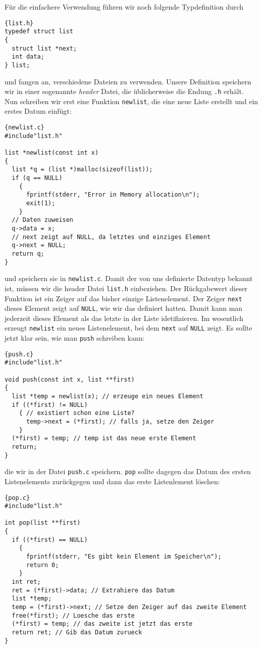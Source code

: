 Für die einfachere Verwendung führen wir noch folgende Typdefinition durch
\begin{lstlisting}{list.h}
typedef struct list
{
  struct list *next;
  int data;
} list;
\end{lstlisting}
und fangen an, verschiedene Dateien zu verwenden.
Unsere Definition speichern wir in einer sogenannte \emph{header} Datei, die üblicherweise die Endung \texttt{.h} erhält.
Nun schreiben wir erst eine Funktion \verb|newlist|, die eine neue Liste erstellt und ein erstes Datum einfügt:
\begin{lstlisting}{newlist.c}
#include"list.h"

list *newlist(const int x)
{
  list *q = (list *)malloc(sizeof(list));
  if (q == NULL)
    {
      fprintf(stderr, "Error in Memory allocation\n");
      exit(1);
    }
  // Daten zuweisen
  q->data = x;
  // next zeigt auf NULL, da letztes und einziges Element
  q->next = NULL;
  return q;
}
\end{lstlisting}
und speichern sie in \texttt{newlist.c}.
Damit der von uns definierte Datentyp bekannt ist, müssen wir die header Datei \texttt{list.h} einbeziehen.
Der Rückgabewert dieser Funktion ist ein Zeiger auf das bisher einzige Listenelement.
Der Zeiger \verb|next| dieses Element zeigt auf \verb|NULL|, wie wir das definiert hatten.
Damit kann man jederzeit dieses Element als das letzte in der Liste idetifizieren.
Im wesentlich erzeugt \verb|newlist| ein neues Listenelement, bei dem \verb|next| auf \verb|NULL| zeigt.
Es sollte jetzt klar sein, wie man \verb|push| schreiben kann:
\begin{lstlisting}{push.c}
#include"list.h"

void push(const int x, list **first)
{
  list *temp = newlist(x); // erzeuge ein neues Element
  if ((*first) != NULL)
    { // existiert schon eine Liste?
      temp->next = (*first); // falls ja, setze den Zeiger
    }
  (*first) = temp; // temp ist das neue erste Element
  return;
}
\end{lstlisting}
die wir in der Datei \texttt{push.c} speichern.
\verb|pop| sollte dagegen das Datum des ersten Listenelements zurückgegen und dann das erste Listenlement löschen:
\begin{lstlisting}{pop.c}
#include"list.h"

int pop(list **first)
{
  if ((*first) == NULL)
    {
      fprintf(stderr, "Es gibt kein Element im Speicher\n");
      return 0;
    }
  int ret;
  ret = (*first)->data; // Extrahiere das Datum
  list *temp;
  temp = (*first)->next; // Setze den Zeiger auf das zweite Element
  free(*first); // Loesche das erste
  (*first) = temp; // das zweite ist jetzt das erste
  return ret; // Gib das Datum zurueck
}
\end{lstlisting}
